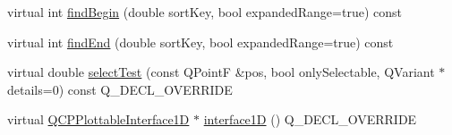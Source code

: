 \begin{DoxyCompactItemize}
\item 
virtual int \hyperlink{class_q_c_p_error_bars_a5c74b510f1d7254263ec18cd3a359a07}{find\+Begin} (double sort\+Key, bool expanded\+Range=true) const
\item 
virtual int \hyperlink{class_q_c_p_error_bars_a64629f13bb290d41dd8f1b37346bfdd4}{find\+End} (double sort\+Key, bool expanded\+Range=true) const
\item 
virtual double \hyperlink{class_q_c_p_error_bars_ac1b6675ef43e32547a3cbcf7b7ac46ed}{select\+Test} (const Q\+PointF \&pos, bool only\+Selectable, Q\+Variant $\ast$details=0) const Q\+\_\+\+D\+E\+C\+L\+\_\+\+O\+V\+E\+R\+R\+I\+DE
\item 
virtual \hyperlink{class_q_c_p_plottable_interface1_d}{Q\+C\+P\+Plottable\+Interface1D} $\ast$ \hyperlink{class_q_c_p_error_bars_a0b6fbf3a943b4241ee485d066cc8562a}{interface1D} () Q\+\_\+\+D\+E\+C\+L\+\_\+\+O\+V\+E\+R\+R\+I\+DE
\end{DoxyCompactItemize}
